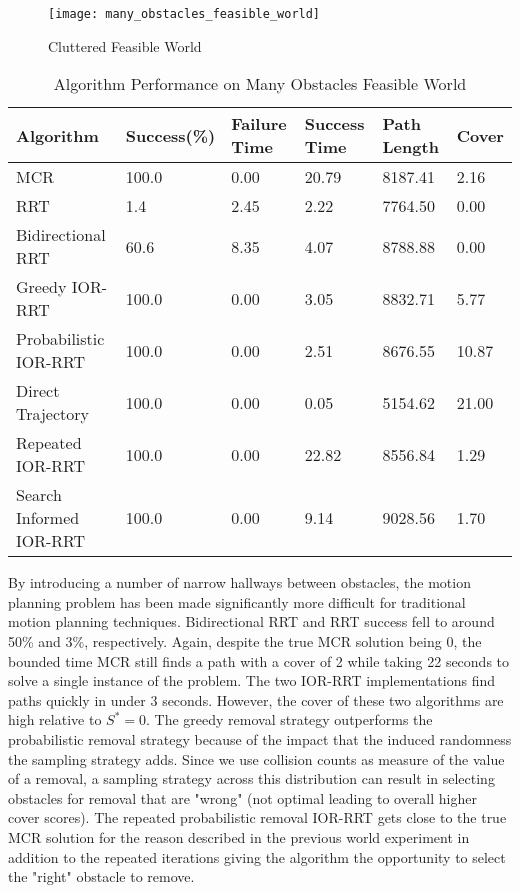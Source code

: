 \begin{figure}[h!]
    \centering
    \texttt{[image: many\_obstacles\_feasible\_world]}
    \caption{Cluttered Feasible World}
    \label{fig:many_obstacles_feasible_world}
\end{figure}


\begin{table}[h!]
\centering
\begin{tabular}{@{}llllll@{}}
\toprule
Algorithm & Success(\%) & Failure Time & Success Time & Path Length & Cover \\
\midrule
MCR & 100.0 & 0.00 & 20.79 & 8187.41 & 2.16 \\
RRT & 1.4 & 2.45 & 2.22 & 7764.50 & 0.00 \\
Bidirectional RRT & 60.6 & 8.35 & 4.07 & 8788.88 & 0.00 \\
Greedy IOR-RRT & 100.0 & 0.00 & 3.05 & 8832.71 & 5.77 \\
Probabilistic IOR-RRT & 100.0 & 0.00 & 2.51 & 8676.55 & 10.87 \\
Direct Trajectory & 100.0 & 0.00 & 0.05 & 5154.62 & 21.00 \\
Repeated IOR-RRT & 100.0 & 0.00 & 22.82 & 8556.84 & 1.29 \\
Search Informed IOR-RRT & 100.0 & 0.00 & 9.14 & 9028.56 & 1.70 \\
\bottomrule
\end{tabular}
\caption{Algorithm Performance on Many Obstacles Feasible World}
\label{tab:many_obstacles_feasible_world}
\end{table}

By introducing a number of narrow hallways between obstacles, the motion planning problem has been made significantly more difficult for traditional motion planning techniques. Bidirectional RRT and RRT success fell to around 50\% and 3\%, respectively. Again, despite the true MCR solution being 0, the bounded time MCR still finds a path with a cover of 2 while taking 22 seconds to solve a single instance of the problem. The two IOR-RRT implementations find paths quickly in under 3 seconds. However, the cover of these two algorithms are high relative to $S^{*} = 0$. The greedy removal strategy outperforms the probabilistic removal strategy because of the impact that the induced randomness the sampling strategy adds. Since we use collision counts as measure of the value of a removal, a sampling strategy across this distribution can result in selecting obstacles for removal that are "wrong" (not optimal leading to overall higher cover scores). The repeated probabilistic removal IOR-RRT gets close to the true MCR solution for the reason described in the previous world experiment in addition to the repeated iterations giving the algorithm the opportunity to select the "right" obstacle to remove. 

